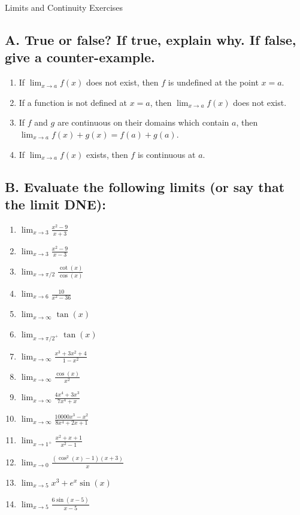 \documentclass{article}
\begin{document}
\begin{center}
\begin{Huge}Limits and Continuity Exercises\end{Huge}
\end{center}


\subsection*{A. True or false? If true, explain why. If false, give a counter-example.}
\begin{enumerate}
\item If $\displaystyle\lim_{x\to a} f(x)$ does not exist, then $f$ is undefined at the point $x=a$.
\item If a function is not defined at $x=a$, then $\displaystyle\lim_{x\to a} f(x)$ does not exist.
\item If $f$ and $g$ are continuous on their domains which contain $a$, then $\displaystyle\lim_{x\to a} f(x) + g(x) = f(a) + g(a).$
\item If $\displaystyle\lim_{x\to a} f(x)$ exists, then $f$ is continuous at $a$.
\end{enumerate}


\subsection*{B. Evaluate the following limits (or say that the limit DNE):}

\begin{multicols}{4}

\begin{enumerate}
\item $\displaystyle\lim_{x\to 3}\frac{x^2-9}{x+3}$
\item $\displaystyle\lim_{x\to 3}\frac{x^2-9}{x-3}$
\item $\displaystyle\lim_{x\to \pi/2}\frac{\cot(x)}{\cos(x)}$
\item $\displaystyle\lim_{x\to 6}\frac{10}{x^2-36}$
\item $\displaystyle\lim_{x\to \infty}\tan(x)$
\item $\displaystyle\lim_{x\to\pi/2^+} \tan(x)$
\item $\displaystyle\lim_{x\to \infty}\frac{x^3+3x^2+4}{1-x^2}$
\item $\displaystyle\lim_{x\to \infty}\frac{\cos(x)}{x^2}$
\item $\displaystyle\lim_{x\to \infty}\frac{4x^4+3x^3}{7x^4+x}$
\item $\displaystyle\lim_{x\to \infty}\frac{10000x^3-x^2}{8x^4+2x+1}$
\item $\displaystyle\lim_{x \rightarrow 1^+} \frac{x^2+x+1}{x^2-1}$
\item $\displaystyle\lim_{x\to 0}\frac{(\cos^2(x) - 1)(x+3)}{x}$
\item $\displaystyle\lim_{x\to 5}x^3+e^x\sin(x)$
\item $\displaystyle\lim_{x\to 5}\frac{6\sin(x-5)}{x-5}$
\end{enumerate}

\end{multicols}
\end{document}
